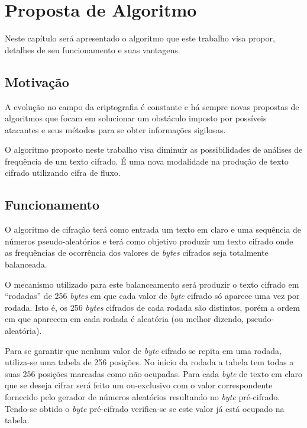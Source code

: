 \chapter{Proposta de Algoritmo}
\label{algorithm-proposition}

Neste capítulo será apresentado o algoritmo que este trabalho visa propor, detalhes de seu funcionamento e suas vantagens.

\section{Motivação}
\label{motivation}

A evolução no campo da criptografia é constante e há sempre novas propostas de algoritmos que focam em solucionar um obstáculo imposto por possíveis atacantes e seus métodos para se obter informações sigilosas.

O algoritmo proposto neste trabalho visa diminuir as possibilidades de análises de frequência de um texto cifrado. É uma nova modalidade na produção de texto cifrado utilizando cifra de fluxo. 


\section{Funcionamento}
\label{functioning}

O algoritmo de cifração terá como entrada um texto em claro e uma sequência de números pseudo-aleatórios e terá como objetivo produzir um texto cifrado onde as frequências de ocorrência dos valores de \textit{bytes} cifrados seja totalmente balanceada.

O mecanismo utilizado para este balanceamento será produzir o texto cifrado em “rodadas” de 256 \textit{bytes} em que cada valor de \textit{byte} cifrado só aparece uma vez por rodada. Isto é, os 256  \textit{bytes} cifrados de cada rodada são distintos, porém a ordem em que aparecem em cada rodada é aleatória (ou melhor dizendo, pseudo-aleatória).

Para se garantir que nenhum valor de \textit{byte} cifrado se repita em uma rodada, utiliza-se uma tabela de 256 posições. No início da rodada a tabela tem todas a suas 256 posições marcadas como não ocupadas. Para cada \textit{byte} de texto em claro que se deseja cifrar será feito um ou-exclusivo com o valor correspondente fornecido pelo gerador de números aleatórios resultando no \textit{byte} pré-cifrado. Tendo-se obtido o \textit{byte} pré-cifrado verifica-se se este valor já está ocupado na tabela. 

